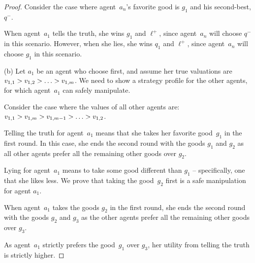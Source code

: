 \begin{proof}
    Consider the case where agent~$a_n$'s favorite good is $g_1$ and his second-best, $q^-$.

    When agent~$a_1$ tells the truth, she wins $g_1$ and $\ell^+$, since agent~$a_n$ will choose $q^-$ in this scenario. 
    However, when she lies, she wins $q_1$ and $\ell^+$, since agent~$a_n$ will choose $g_1$ in this scenario. 
 
    

    (b) Let $a_1$ be an agent who choose first, and assume her true valuations are $v_{1,1} > v_{1,2} > \ldots > v_{1,m}$.
    We need to show a strategy profile for the other agents, for which agent~$a_1$ can safely manipulate. 

    Consider the case where the values of all other agents are: $v_{1,1} > v_{1,m} > v_{1,m-1} > \ldots > v_{1,2}$.

    Telling the truth for agent~$a_1$ means that she takes her favorite good~$g_1$ in the first round. In this case, she ends the second round with the goods $g_1$ and $g_2$ as all other agents prefer all the remaining other goods over $g_2$.

    Lying for agent~$a_1$ means to take some good different than $g_1$ -- specifically, one that she likes less. We prove that taking the good~$g_2$ first is a safe manipulation for agent $a_1$.
    
    When agent~$a_1$ takes the goods $g_2$ in the first round, she ends the second round with the goods $g_2$ and $g_3$ as the other agents prefer all the remaining other goods over $g_3$. 

    As agent~$a_1$ strictly prefers the good~$g_1$ over $g_3$, her utility from telling the truth is strictly higher. 
    

    
    \end{proof}



